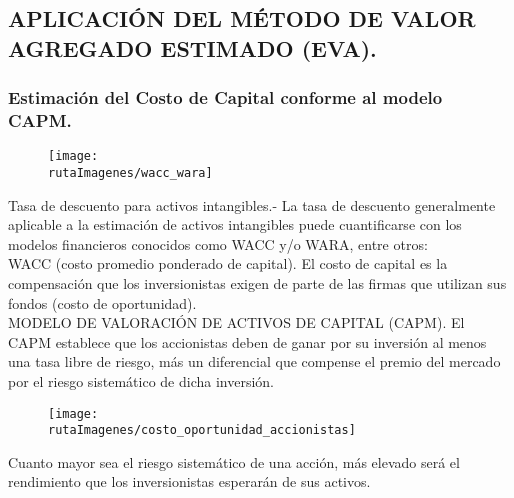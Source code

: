 \subsection{APLICACIÓN DEL MÉTODO DE VALOR AGREGADO ESTIMADO (EVA).}\label{5.2}

\subsubsection{Estimación del Costo de Capital conforme al modelo CAPM. }

\begin{figure}
\centering
\texttt{[image: \\rutaImagenes/wacc\_wara]}
\end{figure}

\textcolor{principal}{Tasa de descuento para activos intangibles}.- La tasa de descuento generalmente aplicable a la estimación de activos intangibles puede cuantificarse con los modelos financieros conocidos como WACC y/o WARA, entre otros:\\

\textcolor{principal}{WACC (costo promedio ponderado de capital)}. El costo de capital es la compensación que los inversionistas exigen de parte de las firmas que utilizan sus fondos (costo de oportunidad). \\

\textcolor{principal}{MODELO DE VALORACIÓN DE ACTIVOS DE CAPITAL (CAPM)}. El CAPM establece que los accionistas deben de ganar por su inversión al menos una tasa libre de riesgo, más un diferencial que compense el premio del mercado por el riesgo sistemático de dicha inversión. 

\begin{figure}
\centering
\texttt{[image: \\rutaImagenes/costo\_oportunidad\_accionistas]}
\end{figure}

Cuanto mayor sea el riesgo sistemático de una acción, más elevado será el rendimiento que los inversionistas esperarán de sus activos.  


